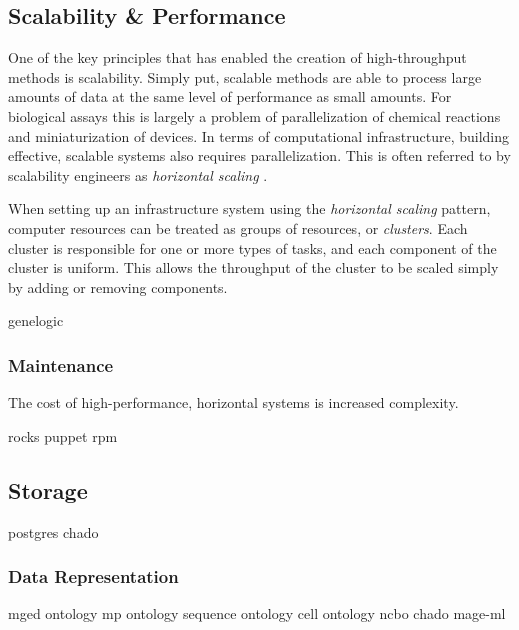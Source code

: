 \subsection{Scalability \& Performance}
\label{Scalability}

One of the key principles that has enabled the creation of high-throughput
methods is scalability.  Simply put, scalable methods are able to process large
amounts of data at the same level of performance as small amounts.  For
biological assays this is largely a problem of parallelization of chemical
reactions and miniaturization of devices.  In terms of computational
infrastructure, building effective, scalable systems also requires
parallelization.  This is often referred to by scalability engineers as
\emph{horizontal scaling} \cite{schlossnagle2006,arlitt2001}.

When setting up an infrastructure system using the \emph{horizontal scaling}
pattern, computer resources can be treated as groups of resources, or
\emph{clusters}.  Each cluster is responsible for one or more types of tasks,
and each component of the cluster is uniform.  This allows the throughput of
the cluster to be scaled simply by adding or removing components.

genelogic		\cite{PMID_17059591}

\subsubsection{Maintenance}

The cost of high-performance, horizontal systems is increased complexity.

rocks		\cite{papadopoulos2003}
puppet		\cite{puppet}
rpm		\cite{bailey1997}

\subsection{Storage}

postgres	\cite{postgresql}
chado		\cite{PMID_17646315}

\subsubsection{Data Representation}

mged ontology		\cite{PMID_16428806}
mp ontology		\cite{PMID_15642099}
sequence ontology	\cite{PMID_15892872}
cell ontology		\cite{PMID_15693950}
ncbo			\cite{PMID_16901225}
chado			\cite{PMID_17646315}
mage-ml			\cite{PMID_12225585}

